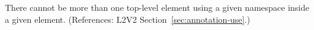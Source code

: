There cannot be more than one top-level element using a given namespace
inside a given  element.  (References: L2V2
Section~\ref{sec:annotation-use}.)
